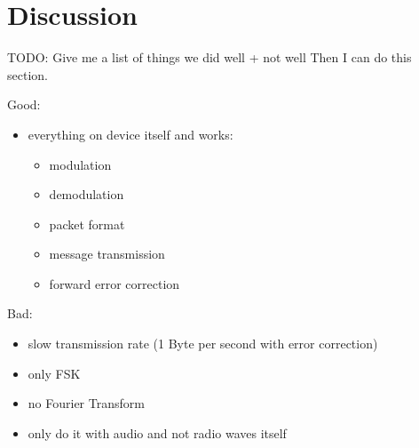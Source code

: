 \chapter{Discussion}

TODO: Give me a list of things we did well + not well
Then I can do this section.

Good:
\begin{itemize}
    \item everything on device itself and works:
    \begin{itemize}
        \item modulation
        \item demodulation
        \item packet format
        \item message transmission
        \item forward error correction
    \end{itemize}
\end{itemize}

Bad:
\begin{itemize}
    \item slow transmission rate (1 Byte per second with error correction)
    \item only FSK
    \item no Fourier Transform
    \item only do it with audio and not radio waves itself
\end{itemize}


